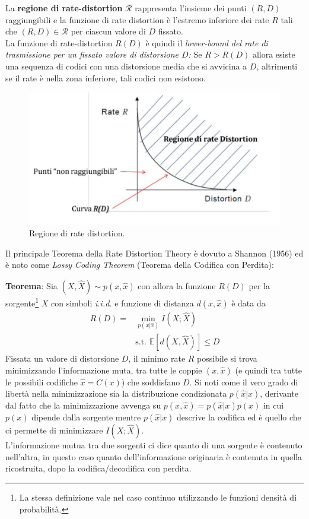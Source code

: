 La \textbf{regione di rate-distortion} $\mathcal{R}$ rappresenta l’insieme dei punti $(R,D)$ raggiungibili e la funzione di rate distortion è l’estremo inferiore dei rate $R$ tali che $(R,D) \in \mathcal{R}$ per ciascun valore di $D$ fissato. \\
La funzione di rate-distortion $R(D)$ è quindi il \textit{lower-bound del rate di trasmissione per un fissato valore di distorsione $D$:} Se $R > R(D)$ allora esiste una sequenza di codici con una distorsione media che si avvicina a $D$, altrimenti se il rate \`e nella zona inferiore, tali codici non esistono.
\begin{figure}[H]
    \centering
    \includegraphics[scale=0.3]{img/rdc.jpg}
    \caption{Regione di rate distortion.}
    \label{fig:rdc}
\end{figure}
Il principale Teorema della Rate Distortion Theory \`e dovuto a Shannon (1956) ed \`e noto come \textit{Lossy Coding Theorem} (Teorema della Codifica con Perdita):

\textbf{Teorema}: Sia $(X,\hat{X}) \sim p(x, \hat{x})$ con allora la funzione $R(D)$ per la sorgente\footnote{La stessa definizione vale nel caso continuo utilizzando le funzioni densità di probabilità.} $X$ con simboli \textit{i.i.d.} e funzione di distanza $d(x, \hat{x})$ \`e data da
\begin{align*}
    R(D) = &\min_{p(x|\hat{x})} I(X; \hat{X}) \\
    &\text{s.t. } \mathbb{E}[d(X, \hat{X})] \leq D
\end{align*}
Fissata un valore di distorsione $D$, il minimo rate $R$ possibile si trova minimizzando l’informazione muta, tra tutte le coppie $(x, \hat{x})$ (e quindi tra tutte le possibili codifiche $\hat{x} = C(x)$) che soddisfano $D$. Si noti come il vero grado di libert\`a nella minimizzazione sia la distribuzione condizionata $p(\hat{x}|x)$, derivante dal fatto che la minimizzazione avvenga su $p(x, \hat{x}) = p(\hat{x}|x)p(x)$ in cui $p(x)$ dipende dalla sorgente mentre $p(\hat{x}|x)$ descrive la codifica ed \`e quello che ci permette di minimizzare $I(X; \hat{X})$.\\
L’informazione mutua tra due sorgenti ci dice quanto di una sorgente è contenuto nell’altra, in questo caso
quanto dell’informazione originaria è contenuta in quella ricostruita, dopo la codifica/decodifica con perdita. 

